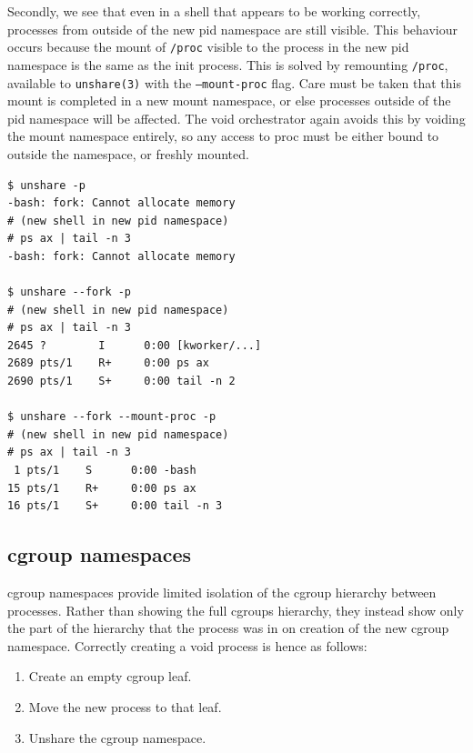 \documentclass[sigplan]{acmart}
\begin{document}
Secondly, we see that even in a shell that appears to be working correctly, processes from outside of the new pid namespace are still visible. This behaviour occurs because the mount of \texttt{/proc} visible to the process in the new pid namespace is the same as the init process. This is solved by remounting \texttt{/proc}, available to \texttt{unshare(3)} with the \texttt{--mount-proc} flag. Care must be taken that this mount is completed in a new mount namespace, or else processes outside of the pid namespace will be affected. The void orchestrator again avoids this by voiding the mount namespace entirely, so any access to proc must be either bound to outside the namespace, or freshly mounted.

\begin{lstlisting}[float,label={lst:unshare-pid}]
$ unshare -p
-bash: fork: Cannot allocate memory
# (new shell in new pid namespace)
# ps ax | tail -n 3
-bash: fork: Cannot allocate memory

$ unshare --fork -p
# (new shell in new pid namespace)
# ps ax | tail -n 3
2645 ?        I      0:00 [kworker/...]
2689 pts/1    R+     0:00 ps ax
2690 pts/1    S+     0:00 tail -n 2

$ unshare --fork --mount-proc -p
# (new shell in new pid namespace)
# ps ax | tail -n 3
 1 pts/1    S      0:00 -bash
15 pts/1    R+     0:00 ps ax
16 pts/1    S+     0:00 tail -n 3

\end{lstlisting}

\subsection{cgroup namespaces}

cgroup namespaces provide limited isolation of the cgroup hierarchy between processes. Rather than showing the full cgroups hierarchy, they instead show only the part of the hierarchy that the process was in on creation of the new cgroup namespace. Correctly creating a void process is hence as follows:

\begin{enumerate}
    \item Create an empty cgroup leaf.
    \item Move the new process to that leaf.
    \item Unshare the cgroup namespace.
\end{enumerate}
\end{document}
